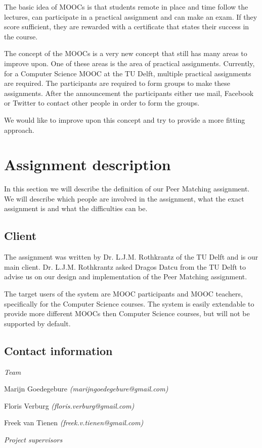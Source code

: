 The basic idea of MOOCs is that students remote in place and time follow the lectures, can participate in a practical assignment and can make an exam.
If they score sufficient, they are rewarded with a certificate that states their success in the course.

The concept of the MOOCs is a very new concept that still has many areas to improve upon.
One of these areas is the area of practical assignments.
Currently, for a Computer Science MOOC at the TU Delft, multiple practical assignments are required.
The participants are required to form groups to make these assignments.
After the announcement the participants either use mail, Facebook or  Twitter to contact other people in order to form the groups.

We would like to improve upon this concept and try to provide a more fitting approach.
\section*{Assignment description}
In this section we will describe the definition of our Peer Matching assignment. 
We will describe which people are involved in the assignment, what the exact assignment is and what the difficulties can be.

\subsection*{Client}
The assignment was written by Dr. L.J.M. Rothkrantz of the TU Delft and is our main client.
Dr. L.J.M. Rothkrantz asked Dragos Datcu from the TU Delft to advise us on our design and implementation of the Peer Matching assignment.

The target users of the system are MOOC participants and MOOC teachers, specifically for the Computer Science courses. The system is easily extendable to provide more different MOOCs then Computer Science courses, but will not be supported by default.

\subsection*{Contact information}
\emph{Team}

Marijn Goedegebure
\emph{(marijngoedegebure@gmail.com)}

Floris Verburg
\emph{(floris.verburg@gmail.com)}

Freek van Tienen
\emph{(freek.v.tienen@gmail.com)}

\noindent\emph{Project supervisors}

